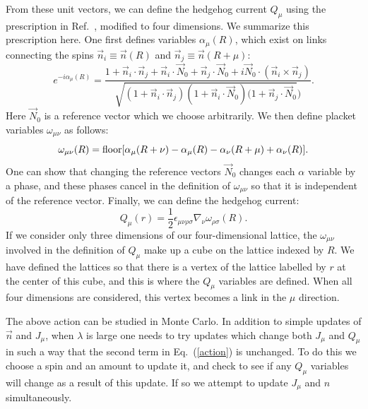 \documentclass[prb,twocolumn]{revtex4-1}
\begin{document}
From these unit vectors, we can define the hedgehog current $Q_\mu$ using the prescription in Ref.~, modified to four dimensions. We summarize this prescription here. One first defines variables $\alpha_\mu(R)$, which exist on links connecting the spins $\vec{n}_i\equiv\vec n(R)$ and $\vec{n}_j\equiv\vec n(R+\mu)$:
\begin{equation}
e^{-i\alpha_{\mu}(R)}=\frac{1+\vec{n}_i\cdot\vec{n}_j+\vec{n}_i\cdot\vec{N}_0+\vec{n}_j\cdot\vec{N}_0+i\vec{N}_0 \cdot(\vec{n}_i\times\vec{n}_j)}{\sqrt{(1+\vec{n}_i\cdot\vec{n}_j)(1+\vec{n}_i\cdot\vec{N}_0)(1+\vec{n}_j\cdot\vec{N}_0})}.
\label{alpha}
\end{equation}
Here $\vec{N}_0$ is a reference vector which we choose arbitrarily. 
We then define placket variables $\omega_{\mu\nu}$ as follows:
\begin{equation}
\omega_{\mu\nu}(R)={\rm floor}[\alpha_\mu(R+\nu)-\alpha_\mu(R)-\alpha_\nu(R+\mu)+\alpha_\nu(R)].
\label{omega}
\end{equation}
One can show that changing the reference vectors $\vec{N}_0$ changes each $\alpha$ variable by a phase, and these phases cancel in the definition of $\omega_{\mu\nu}$ so that it is independent of the reference vector. Finally, we can define the hedgehog current:
\begin{equation}
Q_\mu(r)=\frac{1}{2}\epsilon_{\mu\nu\rho\sigma}\nabla_{\nu} \omega_{\rho\sigma}(R).
\label{monopoledef}
\end{equation}
If we consider only three dimensions of our four-dimensional lattice, the $\omega_{\mu\nu}$ involved in the definition of $Q_\mu$ make up a cube on the lattice indexed by $R$. We have defined the lattices so that there is a vertex of the lattice labelled by $r$ at the center of this cube, and this is where the $Q_\mu$ variables are defined. When all four dimensions are considered, this vertex becomes a link in the $\mu$ direction.  

The above action can be studied in Monte Carlo. In addition to simple updates of $\vec{n}$ and $J_\mu$, when $\lambda$ is large one needs to try updates which change both $J_\mu$ and $Q_\mu$ in such a way that the second term in Eq.~(\ref{action}) is unchanged. To do this we choose a spin and an amount to update it, and check to see if any $Q_\mu$ variables will change as a result of this update. If so we attempt to update $J_\mu$ and $n$ simultaneously.
\end{document}
